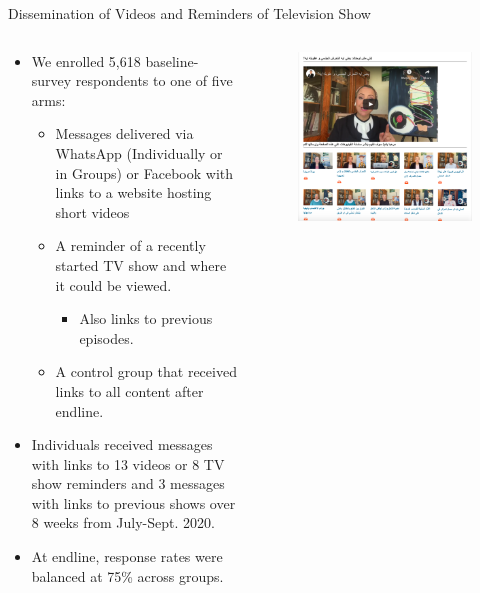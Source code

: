 \documentclass[10pt]{beamer}
\begin{document}
\begin{frame}{Dissemination of Videos and Reminders of Television Show}
\begin{columns}[T] \begin{column}{0.55\textwidth}
\begin{itemize}
    \item We enrolled 5,618 baseline-survey respondents to one of five arms:
    \begin{itemize}
    \item Messages delivered via WhatsApp (Individually or in Groups) or Facebook with links to a website hosting short videos 
        \item A reminder of a recently started TV show and where it could be viewed. \begin{itemize}
        \item Also links to previous episodes. 
        \end{itemize}
        \item A control group that received links to all content after endline.
    \end{itemize}
    \item Individuals received messages with links to 13 videos or 8 TV show reminders and 3 messages with links to previous shows over 8 weeks from July-Sept. 2020.
   \item At endline, response rates were balanced at 75\% across groups.  
\end{itemize}
\end{column}
\begin{column}{0.5\textwidth}
\begin{figure} \includegraphics[width = 1\textwidth]{Recruit_Intervention/mshlwa7dek.org:egypt:v1wfb.png}\captionsetup{font=small}

\end{figure}
\end{column}
\end{columns}
\end{frame}
\end{document}
